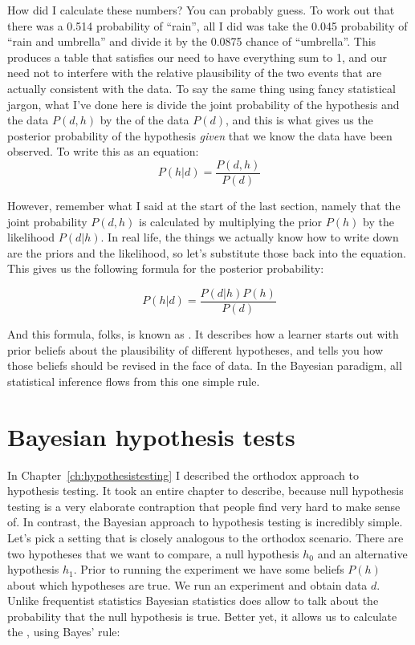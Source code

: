 How did I calculate these numbers? You can probably guess. To work out that there was a 0.514 probability of ``rain'', all I did was take the 0.045 probability of ``rain and umbrella'' and divide it by the 0.0875 chance of ``umbrella''. This produces a table that satisfies our need to have everything sum to 1, and our need not to interfere with the relative plausibility of the two events that are actually consistent with the data. To say the same thing using fancy statistical jargon, what I've done here is divide the joint probability of the hypothesis and the data $P(d,h)$ by the  of the data $P(d)$, and this is what gives us the posterior probability of the hypothesis {\it given} that we know the data have been observed. To write this as an equation:
$$
P(h | d) = \frac{P(d,h)}{P(d)}
$$


\noindent
However, remember what I said at the start of the last section, namely that the joint probability $P(d,h)$ is calculated by multiplying the prior $P(h)$ by the likelihood $P(d|h)$. In real life, the things we actually know how to write down are the priors and the likelihood, so let's substitute those back into the equation. This gives us the following formula for the posterior probability:

$$
P(h | d) = \frac{P(d|h) P(h)}{P(d)}
$$

\noindent
And this formula, folks, is known as . It describes how a learner starts out with prior beliefs about the plausibility of different hypotheses, and tells you how those beliefs should be revised in the face of data. In the Bayesian paradigm, all statistical inference flows from this one simple rule.

\section{Bayesian hypothesis tests~\label{sec:bayesianhypothesistests}}

In Chapter~\ref{ch:hypothesistesting} I described the orthodox approach to hypothesis testing. It took an entire chapter to describe, because null hypothesis testing is a very elaborate contraption that people find very hard to make sense of. In contrast, the Bayesian approach to hypothesis testing is incredibly simple. Let's pick a setting that is closely analogous to the orthodox scenario. There are two hypotheses that we want to compare, a null hypothesis $h_0$ and an alternative hypothesis $h_1$. Prior to running the experiment we have some beliefs $P(h)$ about which hypotheses are true. We run an experiment and obtain data $d$. Unlike frequentist statistics Bayesian statistics does allow to talk about the probability that the null hypothesis is true. Better yet, it allows us to calculate the , using Bayes' rule:

